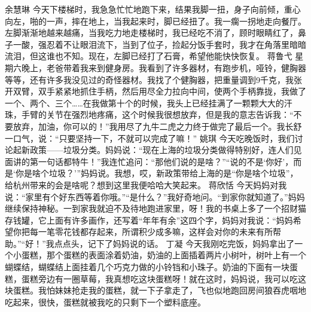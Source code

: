 {}\markdownRendererInterblockSeparator
{}余慧琳\markdownRendererInterblockSeparator
{}今天下楼梯时，我急急忙忙地跑下来，结果我脚一扭，身子向前倾，重心向左，啪的一声，摔在地上，当我起来时，脚已经扭了。我一瘸一拐地走向餐厅。左脚渐渐地越来越痛，当我吃力地走楼梯时，我已经吃不消了，顾时眼睛红了，鼻子一酸，强忍着不让眼泪流下，当到了位子，捡起分饭手套时，我才在角落里暗暗流泪，但这谁也不知。现在，左脚已经打了石膏，希望他能快快恢复。\markdownRendererInterblockSeparator
{}\markdownRendererInterblockSeparator
{}蒋鲁弋\markdownRendererInterblockSeparator
{}星期六晚上，老爸带着我来到健身房。我看到了许多器材，有跑步机，哑铃，健胸器等等，还有许多我没见过的奇怪器材。我找了个健胸器，把重量调到9千克，我张开双臂，双手紧紧地抓住手柄，然后用尽全力拉向中间，使两个手柄靠拢，我做了一个、两个、三个……在我做第十个的时候，我头上已经挂满了一颗颗大大的汗珠，手臂的关节在强烈地疼痛，这个时候我很想放弃，但是我的意志告诉我：“不要放弃，加油，你可以的！”我用尽了九牛二虎之力终于做完了最后一个。我长舒一口气，说：“只要坚持一下，不就可以完成了嘛！”\markdownRendererInterblockSeparator
{}\markdownRendererInterblockSeparator
{}姚琪\markdownRendererInterblockSeparator
{}今天吃晚饭时，我们讨论起新政策——垃圾分类。妈妈说：“现在上海的垃圾分类做得特别好，连人们见面讲的第一句话都特牛！”我连忙追问：“那他们说的是啥？”“说的不是‘你好’，而是‘你是啥个垃圾？’”妈妈说。我想，哎，新政策带给上海的是“你是啥个垃圾”，给杭州带来的会是啥呢？想到这里我便哈哈大笑起来。\markdownRendererInterblockSeparator
{}\markdownRendererInterblockSeparator
{}蒋欣恬\markdownRendererInterblockSeparator
{}今天妈妈对我说：“家里有个好东西等着你哦。”“是什么？”我好奇地问。“到家你就知道了。”妈妈继续保持神秘。一到家我就迫不及待地跑进家里，呀！我的书桌上多了一个招财猫存钱罐，它上面有许多画作，还写着“年年有余”这四个字，妈妈对我说：“妈妈希望你把每一笔零花钱都存起来，所谓积少成多嘛，这样会对你的未来有所帮助。”“好！”我点点头，记下了妈妈说的话。 \markdownRendererInterblockSeparator
{}\markdownRendererInterblockSeparator
{}丁凝\markdownRendererInterblockSeparator
{}今天我刚吃完饭，妈妈拿出了一个小蛋糕，那个蛋糕的表面涂着奶油，奶油的上面插着两片小树叶，树叶上有一个蝴蝶结，蝴蝶结上面挂着几个巧克力做的小铃铛和小珠子。奶油的下面有一块蛋糕，蛋糕旁边有一圈草莓，我真想吃这块蛋糕呀！就在这时，妈妈说，我可以吃这块蛋糕。我怕妹妹抢走我的蛋糕，就一下子拿走了，飞也似地跑回房间狼吞虎咽地吃起来，很快，蛋糕就被我吃的只剩下一个塑料底座。\markdownRendererInterblockSeparator
